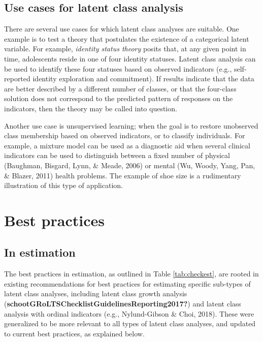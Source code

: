 \documentclass[
  ,man]{apa6}
\begin{document}
\hypertarget{use-cases-for-latent-class-analysis}{%
\subsection{Use cases for latent class analysis}\label{use-cases-for-latent-class-analysis}}

There are several use cases for which latent class analyses are suitable.
One example is to test a theory that postulates the existence of a categorical latent variable.
For example, \emph{identity status theory} posits that, at any given point in time, adolescents reside in one of four identity statuses.
Latent class analysis can be used to identify these four statuses based on observed indicators (e.g., self-reported identity exploration and commitment).
If results indicate that the data are better described by a different number of classes,
or that the four-class solution does not correspond to the predicted pattern of responses on the indicators, then the theory may be called into question.

Another use case is unsupervised learning;
when the goal is to restore unobserved class membership based on observed indicators,
or to classify individuals.
For example, a mixture model can be used as a diagnostic aid when several clinical indicators can be used to distinguish between a fixed number of physical (Baughman, Bisgard, Lynn, \& Meade, 2006) or mental (Wu, Woody, Yang, Pan, \& Blazer, 2011) health problems.
The example of shoe size is a rudimentary illustration of this type of application.

\hypertarget{best-practices}{%
\section{Best practices}\label{best-practices}}

\hypertarget{in-estimation}{%
\subsection{In estimation}\label{in-estimation}}

The best practices in estimation, as outlined in Table \ref{tab:checkest},
are rooted in existing recommendations for best practices for estimating
specific sub-types of latent class analyses,
including latent class growth analysis (\textbf{schootGRoLTSChecklistGuidelinesReporting2017?})
and latent class analysis with ordinal indicators (e.g., Nylund-Gibson \& Choi, 2018).
These were generalized to be more relevant to all types of latent class analyses,
and updated to current best practices, as explained below.
\end{document}
